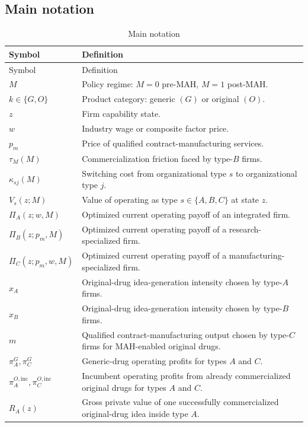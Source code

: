 \documentclass[12pt]{article}
\newcommand{\1}{\mathbf{1}}
\begin{document}
\subsection{Main notation}

\begin{longtable}{p{}p{}}
\caption{Main notation}\label{tab:notation}\\
\toprule
Symbol & Definition \\
\midrule
\endfirsthead
\toprule
Symbol & Definition \\
\midrule
\endhead
$M$ & Policy regime: $M=0$ pre-MAH, $M=1$ post-MAH. \\
$k\in\{G,O\}$ & Product category: generic $(G)$ or original $(O)$. \\
$z$ & Firm capability state. \\
$w$ & Industry wage or composite factor price. \\
$p_m$ & Price of qualified contract-manufacturing services. \\
$\tau_M(M)$ & Commercialization friction faced by type-$B$ firms. \\
$\kappa_{sj}(M)$ & Switching cost from organizational type $s$ to organizational type $j$. \\
$V_s(z;M)$ & Value of operating as type $s\in\{A,B,C\}$ at state $z$. \\
$\Pi_A(z;w,M)$ & Optimized current operating payoff of an integrated firm. \\
$\Pi_B(z;p_m,M)$ & Optimized current operating payoff of a research-specialized firm. \\
$\Pi_C(z;p_m,w,M)$ & Optimized current operating payoff of a manufacturing-specialized firm. \\
$x_A$ & Original-drug idea-generation intensity chosen by type-$A$ firms. \\
$x_B$ & Original-drug idea-generation intensity chosen by type-$B$ firms. \\
$m$ & Qualified contract-manufacturing output chosen by type-$C$ firms for MAH-enabled original drugs. \\
$\pi_A^G,\pi_C^G$ & Generic-drug operating profits for types $A$ and $C$. \\
$\pi_A^{O,\mathrm{inc}},\pi_C^{O,\mathrm{inc}}$ & Incumbent operating profits from already commercialized original drugs for types $A$ and $C$. \\
$R_A(z)$ & Gross private value of one successfully commercialized original-drug idea inside type $A$. \\

\end{longtable}
\end{document}
